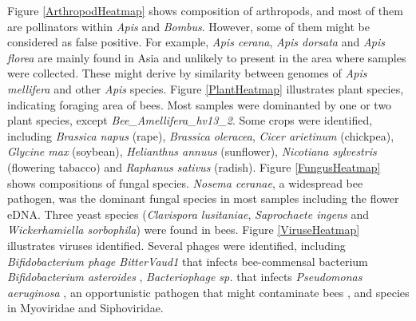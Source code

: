 \documentclass[11pt]{article}
\begin{document}
    \newline
    Figure \ref{ArthropodHeatmap} shows composition of arthropods, and most of them are pollinators within \textit{Apis} and \textit{Bombus}. 
    However, some of them might be considered as false positive. 
    For example, \textit{Apis cerana}, \textit{Apis dorsata} and \textit{Apis florea} are mainly found in Asia and unlikely to present in the area where samples were collected. 
    These might derive by similarity between genomes of \textit{Apis mellifera} and other \textit{Apis} species. 
    \newline
    Figure \ref{PlantHeatmap} illustrates plant species, indicating foraging area of bees. 
    Most samples were dominanted by one or two plant species, except \textit{Bee\_Amellifera\_hv13\_2}. 
    Some crops were identified, including \textit{Brassica napus} (rape), \textit{Brassica oleracea}, \textit{Cicer arietinum} (chickpea), \textit{Glycine max} (soybean), \textit{Helianthus annuus} (sunflower), \textit{Nicotiana sylvestris} (flowering tabacco) and \textit{Raphanus sativus} (radish).
    \newline
    Figure \ref{FungusHeatmap} shows compositions of fungal species. 
    \textit{Nosema ceranae}, a widespread bee pathogen, was the dominant fungal species in most samples including the flower eDNA. 
    Three yeast species (\textit{Clavispora lusitaniae}, \textit{Saprochaete ingens} and \textit{Wickerhamiella sorbophila}) were found in bees. 
    \newline
    Figure \ref{ViruseHeatmap} illustrates viruses identified. 
    Several phages were identified, including \textit{Bifidobacterium phage BitterVaud1} that infects bee-commensal bacterium \textit{Bifidobacterium asteroides} \citep{bonilla2020honey}, \textit{Bacteriophage sp.} that infects \textit{Pseudomonas aeruginosa} \citep{essoh2015investigation}, an opportunistic pathogen that might contaminate bees \citep{bailey1968honey,papadopoulou1992experimental,papadopoulou1993haemocyte}, and species in Myoviridae and Siphoviridae. 
\end{document}
